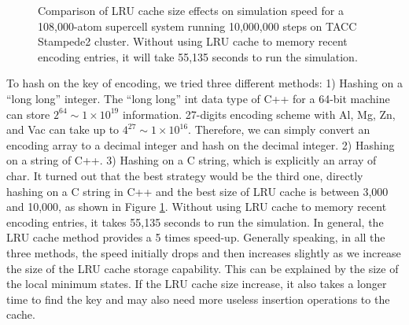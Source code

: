 \begingroup
\begin{figure}[!ht]
  \centering
\caption[Comparison of \acs{LRU} cache size effects on simulation speed for a 108,000-atom supercell system running 10,000,000 steps on TACC Stampede2 cluster.]{Comparison of \acs{LRU} cache size effects on simulation speed for a 108,000-atom supercell system running 10,000,000 steps on TACC Stampede2 cluster. Without using \ac{LRU} cache to memory recent encoding entries, it will take 55,135 seconds to run the simulation.}
\label{Chap:Al/Vac:fig:lru_size}
\end{figure}
\endgroup


To hash on the key of encoding, we tried three different methods: 1) Hashing on a ``long long'' integer. The ``long long'' int data type of C++ for a 64-bit machine can store $2^{64} \sim 1\times10^{19}$ information. 27-digits encoding scheme with Al, Mg, Zn, and Vac can take up to $4^{27} \sim 1\times10^{16}$. Therefore, we can simply convert an encoding array to a decimal integer and hash on the decimal integer. 2) Hashing on a string of C++. 3) Hashing on a C string, which is explicitly an array of char. It turned out that the best strategy would be the third one, directly hashing on a C string in C++ and the best size of \ac{LRU} cache is between 3,000 and 10,000, as shown in Figure \ref{Chap:Al/Vac:fig:lru_size}. Without using \ac{LRU} cache to memory recent encoding entries, it takes 55,135 seconds to run the simulation. In general, the \ac{LRU} cache method provides a 5 times speed-up. Generally speaking, in all the three methods, the speed initially drops and then increases slightly as we increase the size of the \ac{LRU} cache storage capability. This can be explained by the size of the local minimum states. If the \ac{LRU} cache size increase, it also takes a longer time to find the key and may also need more useless insertion operations to the cache.

